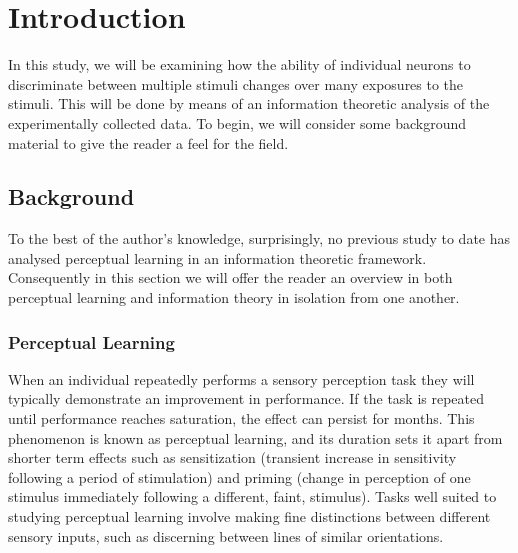\section{Introduction}

In this study, we will be examining how the ability of individual neurons to discriminate between multiple stimuli changes over many exposures to the stimuli.
This will be done by means of an information theoretic analysis of the experimentally collected data.
To begin, we will consider some background material to give the reader a feel for the field.

\subsection{Background}
\label{ch:bg}

To the best of the author's knowledge, surprisingly, no previous study to date has analysed perceptual learning in an information theoretic framework.
Consequently in this section we will offer the reader an overview in both perceptual learning and information theory in isolation from one another.

\subsubsection{Perceptual Learning}
\label{sec:bgpl}

When an individual repeatedly performs a sensory perception task they will typically demonstrate an improvement in performance. If the task is repeated until performance reaches saturation, the effect can persist for months. This phenomenon is known as perceptual learning, and its duration sets it apart from shorter term effects such as sensitization (transient increase in sensitivity following a period of stimulation) and priming (change in perception of one stimulus immediately following a different, faint, stimulus).
Tasks well suited to studying perceptual learning involve making fine distinctions between different sensory inputs, such as discerning between lines of similar orientations.

